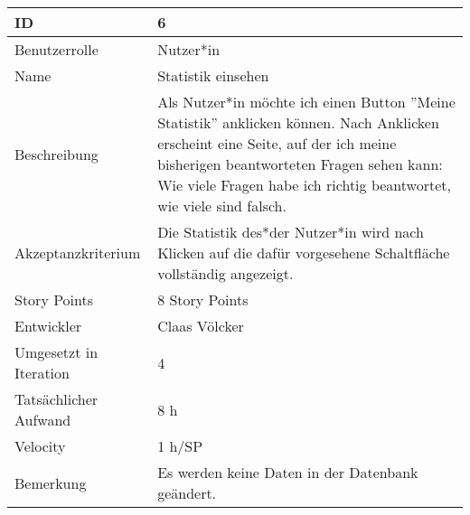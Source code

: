 \begin{tabularx}{\textwidth}{|p{}|X|}
	\hline
	ID & 6\\
	\hline
	Benutzerrolle & Nutzer*in\\
	\hline
	Name & Statistik einsehen\\
	\hline
	Beschreibung & Als Nutzer*in möchte ich einen Button ''Meine Statistik'' anklicken können. Nach Anklicken erscheint eine Seite, auf der ich meine bisherigen beantworteten Fragen sehen kann: Wie viele Fragen habe ich richtig beantwortet, wie viele sind falsch.\\
	\hline
	Akzeptanzkriterium & Die Statistik des*der Nutzer*in wird nach Klicken auf die dafür vorgesehene Schaltfläche vollständig angezeigt.\\
	\hline
	Story Points & 8 Story Points\\
	\hline
	Entwickler & Claas Völcker\\
	\hline
	Umgesetzt in Iteration & 4\\
	\hline
	Tatsächlicher Aufwand & 8 h\\
	\hline
	Velocity & 1 h/SP\\
	\hline
	Bemerkung &  Es werden keine Daten in der Datenbank geändert.\\
	\hline
\end{tabularx}
\vspace{20pt}
